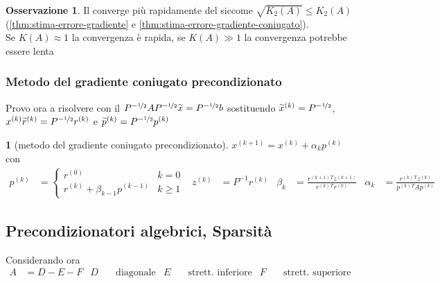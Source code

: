 \documentclass[a4paper,10pt]{article}
\theoremstyle{definition}
\theoremstyle{indentdefinition}
\theoremstyle{indenttheorem}
\theoremstyle{myremark}
\newtheorem*{rem*}{Osservazione}
\theoremstyle{indentgeneral}
\newtheorem{lyxalgorithm}[thm]{\protect\algorithmname}
\theoremstyle{plain}
\theoremstyle{plain}
\begin{document}
\begin{rem*}
Il  converge più rapidamente
del  siccome $\sqrt{K_{2}\left(A\right)}\leq K_{2}\left(A\right)$
(\ref{thm:stima-errore-gradiente} e \ref{thm:stima-errore-gradiente-coniugato}). \\
Se $K(A)\approx 1$ la convergenza è rapida, se $K(A)\gg 1$ la convergenza potrebbe essere lenta
\end{rem*}

\subsubsection{Metodo del gradiente coniugato precondizionato}

Provo ora a risolvere con il 
$P^{-\nicefrac{1}{2}}AP^{-\nicefrac{1}{2}}\widetilde{x}=P^{-\nicefrac{1}{2}}b$
sostituendo $\widetilde{x}^{\left(k\right)}=P^{-\nicefrac{1}{2}}$,
$x^{\left(k\right)}\widetilde{r}^{\left(k\right)}=P^{-\nicefrac{1}{2}}r^{\left(k\right)}$
e $\widetilde{p}^{\left(k\right)}=P^{-\nicefrac{1}{2}}p^{\left(k\right)}$
\begin{lyxalgorithm}[metodo del gradiente coniugato precondizionato]
$x^{\left(k+1\right)}=x^{\left(k\right)}+\alpha_{k}p^{\left(k\right)}$
con 
\begin{align*}
p^{\left(k\right)} & =\begin{cases}
r^{\left(0\right)} & k=0\\
r^{\left(k\right)}+\beta_{k-1}p^{\left(k-1\right)} & k\geq1
\end{cases} & z^{\left(k\right)} & =P^{-1}r^{\left(k\right)} & \beta_{k} & =\frac{r^{\left(k+1\right)}{}^{T}z^{\left(k+1\right)}}{r^{\left(k\right)}{}^{T}r^{\left(k\right)}} & \alpha_{k} & =\frac{r^{\left(k\right)}{}^{T}z^{\left(k\right)}}{p^{\left(k\right)}{}^{T}Ap^{\left(k\right)}}
\end{align*}
\end{lyxalgorithm}


\subsection{Precondizionatori algebrici, Sparsità}

Considerando ora
\begin{align*}
A & =D-E-F & D & \quad\text{diagonale} & E & \quad\text{strett. inferiore} & F & \quad\text{strett. superiore}
\end{align*}
\end{document}
